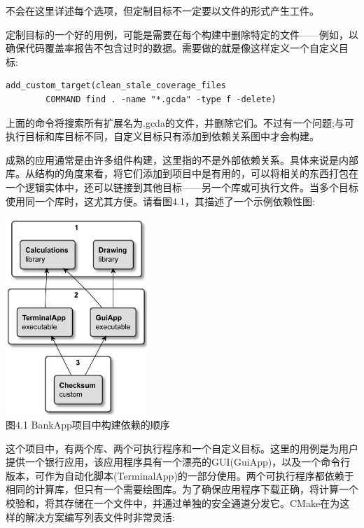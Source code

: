 不会在这里详述每个选项，但定制目标不一定要以文件的形式产生工件。

定制目标的一个好的用例，可能是需要在每个构建中删除特定的文件——例如，以确保代码覆盖率报告不包含过时的数据。需要做的就是像这样定义一个自定义目标:

\begin{lstlisting}[style=styleCMake]
add_custom_target(clean_stale_coverage_files
		COMMAND find . -name "*.gcda" -type f -delete)
\end{lstlisting}

上面的命令将搜索所有扩展名为.gcda的文件，并删除它们。不过有一个问题;与可执行目标和库目标不同，自定义目标只有添加到依赖关系图中才会构建。


成熟的应用通常是由许多组件构建，这里指的不是外部依赖关系。具体来说是内部库。从结构的角度来看，将它们添加到项目中是有用的，可以将相关的东西打包在一个逻辑实体中，还可以链接到其他目标——另一个库或可执行文件。当多个目标使用同一个库时，这尤其方便。请看图4.1，其描述了一个示例依赖性图:

\begin{center}
\includegraphics[width=0.4\textwidth]{content/2/chapter4/images/1.jpg}\\
图4.1  BankApp项目中构建依赖的顺序
\end{center}

这个项目中，有两个库、两个可执行程序和一个自定义目标。这里的用例是为用户提供一个银行应用，该应用程序具有一个漂亮的GUI(GuiApp)，以及一个命令行版本，可作为自动化脚本(TerminalApp)的一部分使用。两个可执行程序都依赖于相同的计算库，但只有一个需要绘图库。为了确保应用程序下载正确，将计算一个校验和，将其存储在一个文件中，并通过单独的安全通道分发它。CMake在为这样的解决方案编写列表文件时非常灵活:

